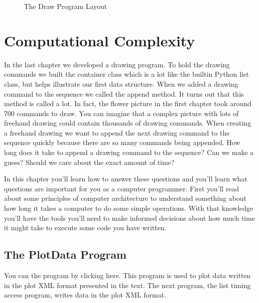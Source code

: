 \documentclass[letterpaper,10pt,english]{sphinxmanual}
\begin{document}
\begin{figure}[htbp]
\centering
\capstart

\noindent{}
\caption{The Draw Program Layout}\label{\detokenize{chap1/chap1:id7}}\end{figure}


\chapter{Computational Complexity}
\label{\detokenize{chap2/chap2:computational-complexity}}\label{\detokenize{chap2/chap2:chap2}}\label{\detokenize{chap2/chap2::doc}}
In the last chapter we developed a drawing program. To hold the drawing commands we built the  container class which is a lot like the built\sphinxhyphen{}in Python list class, but helps illustrate our first data structure. When we added a drawing command to the sequence we called the append method. It turns out that this method is called a lot. In fact, the flower picture in the first chapter took around 700 commands to draw. You can imagine that a complex picture with lots of free\sphinxhyphen{}hand drawing could contain thousands of drawing commands. When creating a free\sphinxhyphen{}hand drawing we want to append the next drawing command to the sequence quickly because there are so many commands being appended. How long does it take to append a drawing command to the sequence? Can we make a guess? Should we care about the exact amount of time?

In this chapter you’ll learn how to answer these questions and you’ll learn what questions are important for you as a computer programmer. First you’ll read about some principles of computer architecture to understand something about how long it takes a computer to do some simple operations. With that knowledge you’ll have the tools you’ll need to make informed decisions about how much time it might take to execute some code you have written.


\section{The PlotData Program}
\label{\detokenize{chap2/chap2:the-plotdata-program}}
You can  the program by clicking here. This program is used to plot data written in the plot XML format presented in the text. The next program, the list timing access program, writes data in the plot XML format.
\end{document}
